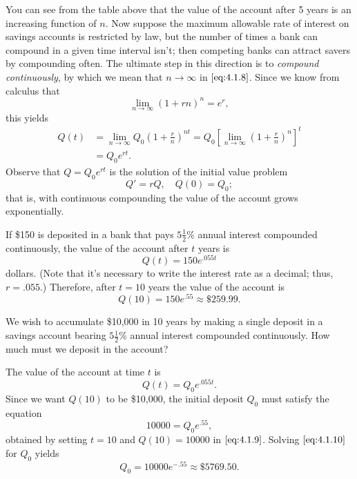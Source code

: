 \documentclass{ximera}
\begin{document}
You can see from the table above that the value of the account after 5 years is an increasing function of $n$. Now suppose the maximum
allowable rate of interest on savings accounts is restricted by law,
but the number of times a bank can compound in a given time interval isn't;  %
then competing banks can attract savers by compounding often. The ultimate step in this direction is to \textit{compound continuously}, by which we mean that $n\rightarrow\infty$ in $\eqref{eq:4.1.8}$. Since we know from calculus
that
$$
\lim_{n\rightarrow\infty} \left(1+{r}{n}\right)^n=e^r,
$$
 this yields
$$\begin{array}{rl}
Q(t) & =\lim_{n\rightarrow\infty} Q_0\left(1+\frac{r}{n}\right)^{nt}=Q_0 \left[
\lim_{n\rightarrow\infty} \left(1+\frac{r}{n}\right)^n\right]^t \\
&=Q_0e^{rt}.
\end{array}$$
Observe that $Q=Q_0e^{rt}$ is the solution of the initial value problem
$$
Q'=rQ, \quad Q(0)=Q_0;
$$
 that is, with continuous compounding the value of the account
grows exponentially.

\begin{example}\label{example:4.1.2}
If \$150 is deposited in a bank that pays
$5\frac{1}{2}$\% annual
interest compounded continuously,  the value of the account after
$t$ years is
$$
Q(t)=150e^{.055t}
$$
dollars. (Note that it's necessary to write the interest rate as a
decimal;   thus, $r=.055$.) Therefore, after $t=10$ years the value
of the account is
$$
Q(10)=150e^{.55} \approx \$259.99.
$$
\end{example}

\begin{example}\label{example:4.1.3}
We wish to accumulate \$10,000 in 10 years by making a single deposit
in a savings account bearing $5\frac{1}{2}$\% annual interest
compounded continuously. How much must we deposit in the account?


\begin{explanation}  
The value of the account at time $t$ is
\begin{equation} \label{eq:4.1.9}
Q(t)=Q_0e^{.055t}.
\end{equation}
Since we want $Q(10)$ to be \$10,000, the initial deposit $Q_0$ must
satisfy the equation
\begin{equation} \label{eq:4.1.10}
10000=Q_0e^{.55},
\end{equation}
 obtained by setting $t=10$ and $Q(10)=10000$ in
$\eqref{eq:4.1.9}$.  Solving $\eqref{eq:4.1.10}$ for $Q_0$ yields
$$
Q_0=10000e^{-.55} \approx \$5769.50.
$$
\end{explanation}
\end{example}
\end{document}
